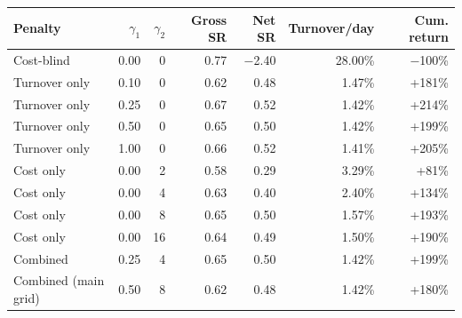 \begin{tabular}{lrrrrrr}
\toprule
Penalty & $\gamma_1$ & $\gamma_2$ & Gross SR & Net SR & Turnover/day & Cum. return \\
\midrule
Cost-blind & 0.00 & 0 & 0.77 & $-$2.40 & 28.00\% & $-$100\% \\
Turnover only & 0.10 & 0 & 0.62 & 0.48 & 1.47\% & +181\% \\
Turnover only & 0.25 & 0 & 0.67 & 0.52 & 1.42\% & +214\% \\
Turnover only & 0.50 & 0 & 0.65 & 0.50 & 1.42\% & +199\% \\
Turnover only & 1.00 & 0 & 0.66 & 0.52 & 1.41\% & +205\% \\
Cost only & 0.00 & 2 & 0.58 & 0.29 & 3.29\% & +81\% \\
Cost only & 0.00 & 4 & 0.63 & 0.40 & 2.40\% & +134\% \\
Cost only & 0.00 & 8 & 0.65 & 0.50 & 1.57\% & +193\% \\
Cost only & 0.00 & 16 & 0.64 & 0.49 & 1.50\% & +190\% \\
Combined & 0.25 & 4 & 0.65 & 0.50 & 1.42\% & +199\% \\
Combined (main grid) & 0.50 & 8 & 0.62 & 0.48 & 1.42\% & +180\% \\
\bottomrule
\end{tabular}
